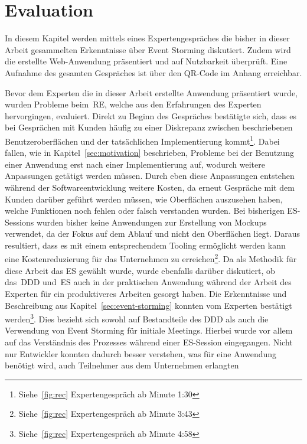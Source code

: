 \chapter{Evaluation}\label{ch:evaluation}
In diesem Kapitel werden mittels eines Expertengespräches die bisher in dieser Arbeit gesammelten Erkenntnisse über Event Storming diskutiert.
Zudem wird die erstellte Web-Anwendung präsentiert und auf Nutzbarkeit überprüft.
Eine Aufnahme des gesamten Gespräches ist über den QR-Code im Anhang erreichbar.

Bevor dem Experten die in dieser Arbeit erstellte Anwendung präsentiert wurde, wurden Probleme beim~\ac{RE}, welche aus den Erfahrungen des Experten
hervorgingen, evaluiert.
Direkt zu Beginn des Gespräches bestätigte sich, dass es bei Gesprächen mit Kunden häufig zu einer Diskrepanz zwischen beschriebenen Benutzeroberflächen und der
tatsächlichen Implementierung kommt\footnote{Siehe~\ref{fig:rec} Expertengespräch ab Minute 1:30}.
Dabei fallen, wie in Kapitel~\ref{sec:motivation} beschrieben, Probleme bei der Benutzung einer Anwendung erst nach einer Implementierung auf, wodurch
weitere Anpassungen getätigt werden müssen.
Durch eben diese Anpassungen entstehen während der Softwareentwicklung weitere Kosten, da erneut Gespräche mit dem Kunden darüber geführt werden müssen,
wie Oberflächen auszusehen haben, welche Funktionen noch fehlen oder falsch verstanden wurden.
Bei bisherigen \ac{ES}-Sessions wurden bisher keine Anwendungen zur Erstellung von Mockups verwendet, da der Fokus auf dem Ablauf und nicht den Oberflächen liegt.
Daraus resultiert, dass es mit einem entsprechendem Tooling ermöglicht werden kann eine Kostenreduzierung für das Unternehmen zu erreichen\footnote{Siehe~\ref{fig:rec} Expertengespräch ab Minute  3:43}.\newline
Da als Methodik für diese Arbeit das \ac{ES} gewählt wurde, wurde ebenfalls darüber diskutiert, ob das~\ac{DDD} und~\ac{ES} auch in der praktischen
Anwendung während der Arbeit des Experten für ein produktiveres Arbeiten gesorgt haben.
Die Erkenntnisse und Beschreibung aus Kapitel~\ref{sec:event-storming} konnten vom Experten bestätigt werden\footnote{Siehe~\ref{fig:rec} Expertengespräch ab Minute  4:58}.
Dies bezieht sich sowohl auf Bestandteile des \ac{DDD} als auch die Verwendung von Event Storming für initiale Meetings.
Hierbei wurde vor allem auf das Verständnis des Prozesses während einer \ac{ES}-Session eingegangen.
Nicht nur Entwickler konnten dadurch besser verstehen, was für eine Anwendung benötigt wird, auch Teilnehmer aus dem Unternehmen erlangten
